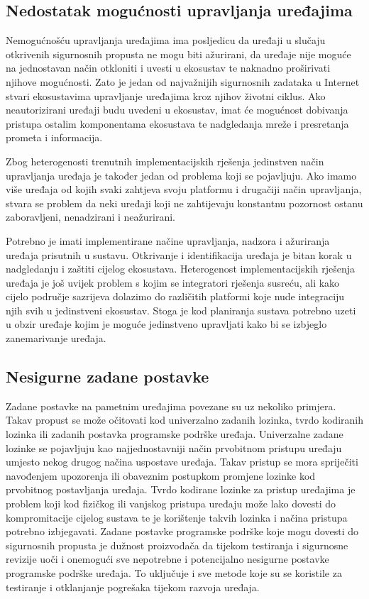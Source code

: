 \documentclass[times, utf8, diplomski]{fer}
\begin{document}
\subsection{Nedostatak mogućnosti upravljanja uređajima}
Nemogućnošću upravljanja uređajima ima posljedicu da uređaji u slučaju otkrivenih sigurnosnih propusta ne mogu biti ažurirani, da uređaje nije moguće na jednostavan način otkloniti i uvesti u ekosustav te naknadno proširivati njihove mogućnosti. Zato je jedan od najvažnijih sigurnosnih zadataka u Internet stvari ekosustavima upravljanje uređajima kroz njihov životni ciklus. Ako neautorizirani uređaji budu uvedeni u ekosustav, imat će mogućnost dobivanja pristupa ostalim komponentama ekosustava te nadgledanja mreže i presretanja prometa i informacija. 

Zbog heterogenosti trenutnih implementacijskih rješenja jedinstven način upravljanja uređaja je također jedan od problema koji se pojavljuju. Ako imamo više uređaja od kojih svaki zahtjeva svoju platformu i drugačiji način upravljanja, stvara se problem da neki uređaji koji ne zahtijevaju konstantnu pozornost ostanu zaboravljeni, nenadzirani i neažurirani. 

Potrebno je imati implementirane načine upravljanja, nadzora i ažuriranja uređaja prisutnih u sustavu. Otkrivanje i identifikacija uređaja je bitan korak u nadgledanju i zaštiti cijelog ekosustava. Heterogenost implementacijskih rješenja uređaja je još uvijek problem s kojim se integratori rješenja susreću, ali kako cijelo područje sazrijeva dolazimo do različitih platformi koje nude integraciju njih svih u jedinstveni ekosustav. Stoga je kod planiranja sustava potrebno uzeti u obzir uređaje kojim je moguće jedinstveno upravljati kako bi se izbjeglo zanemarivanje uređaja.

\subsection{Nesigurne zadane postavke}
Zadane postavke na pametnim uređajima povezane su uz nekoliko primjera. Takav propust se može očitovati kod univerzalno zadanih lozinka, tvrdo kodiranih lozinka ili zadanih postavka programske podrške uređaja. Univerzalne zadane lozinke se pojavljuju kao najjednostavniji način prvobitnom pristupu uređaju umjesto nekog drugog načina uspostave uređaja. Takav pristup se mora spriječiti navođenjem upozorenja ili obaveznim postupkom promjene lozinke kod prvobitnog postavljanja uređaja. Tvrdo kodirane lozinke za pristup uređajima je problem koji kod fizičkog ili vanjskog pristupa uređaju može lako dovesti do kompromitacije cijelog sustava te je korištenje takvih lozinka i načina pristupa potrebno izbjegavati. Zadane postavke programske podrške koje mogu dovesti do sigurnosnih propusta je dužnost proizvođača da tijekom testiranja i sigurnosne revizije uoči i onemogući sve nepotrebne i potencijalno nesigurne postavke programske podrške uređaja. To uključuje i sve metode koje su se koristile za testiranje i otklanjanje pogrešaka tijekom razvoja uređaja.
\end{document}
